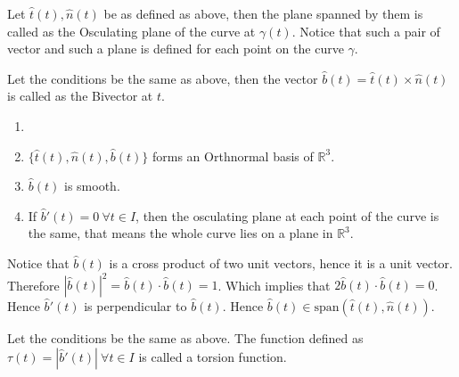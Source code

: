 \vspace{0.4cm}
\begin{definition}
    Let $\hat{t}(t), \hat{n}(t)$ be as defined as above, then the plane spanned by them is called as the Osculating plane of the curve at $\gamma(t)$. Notice that such a pair of vector and such a plane is defined for each point on the curve $\gamma$.
\end{definition}
\vspace{0.4cm}
\begin{definition}[Bivector]
    Let the conditions be the same as above, then the vector $\hat{b}(t)=\hat{t}(t)\times\hat{n}(t)$ is called as the Bivector at $t$.
\end{definition}
\vspace{0.4cm}
\begin{remark}
    \begin{enumerate}[label=\roman*.]
        \item [] 
        \item $\{\hat{t}(t),\hat{n}(t),\hat{b}(t)\}$ forms an Orthnormal basis of $\mathbb{R}^{3}$.
        \item $\hat{b}(t)$ is smooth.
        \item If $\hat{b}'(t)=0~\forall t\in I$, then the osculating plane at each point of the curve is the same, that means the whole curve lies on a plane in $\mathbb{R}^{3}$.
    \end{enumerate}
\end{remark}
\vspace{0.4cm}
\begin{note}
    Notice that $\hat{b}(t)$ is a cross product of two unit vectors, hence it is a unit vector.\\ 
    Therefore $|\hat{b}(t)|^{2}=\hat{b}(t)\cdot\hat{b}(t)=1$. Which implies that $2\hat{b}(t)\cdot\hat{b}(t)=0$. Hence $\hat{b}'(t)$ is perpendicular to $\hat{b}(t)$.
    Hence $\hat{b}(t)\in\text{span}\left(\hat{t}(t),\hat{n}(t)\right)$.
\end{note}
\vspace{0.4cm}
\begin{definition}
    Let the conditions be the same as above. The function defined as $\tau(t)=|\hat{b}'(t)|~\forall t\in I$ is called a torsion function.
\end{definition}
\vspace{0.4cm}
